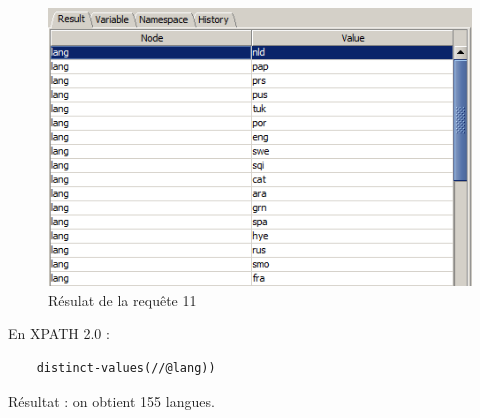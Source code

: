 \documentclass{article}
\begin{document}
\begin{enumerate}[1)]
    \begin{figure}[h!]
    \centering
    \includegraphics[scale=1]{query11.PNG}
    \caption{Résulat de la requête 11}
    \end{figure}
    
    En XPATH 2.0 :
    \begin{lstlisting}
    distinct-values(//@lang)) 
    \end{lstlisting}
    
    Résultat : on obtient 155 langues.
    
\end{enumerate}
\end{document}
